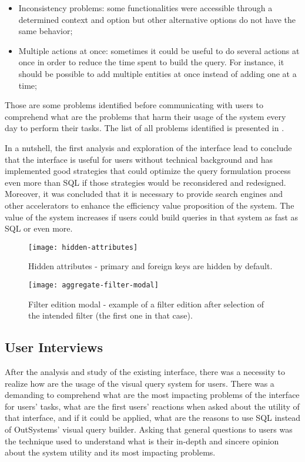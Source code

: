 \begin{itemize}
    \item Inconsistency problems: some functionalities were accessible through a determined context and option but other alternative options do not have the same behavior;
    \item Multiple actions at once: sometimes it could be useful to do several actions at once in order to reduce the time spent to build the query. For instance, it should be possible to add multiple entities at once instead of adding one at a time; 
\end{itemize}

Those are some problems identified before communicating with users to comprehend what are the problems that harm their usage of the system every day to perform their tasks. The list of all problems identified is presented in .

In a nutshell, the first analysis and exploration of the interface lead to conclude that the interface is useful for users without technical background and has implemented good strategies that could optimize the query formulation process even more than \gls{SQL} if those strategies would be reconsidered and redesigned. Moreover, it was concluded that it is necessary to provide search engines and other accelerators to enhance the efficiency value proposition of the system. The value of the system increases if users could build queries in that system as fast as \gls{SQL} or even more.

\begin{figure}[htbp]
	\centering
	\texttt{[image: hidden-attributes]}
	\caption{Hidden attributes - primary and foreign keys are hidden by default.}
	\label{fig:hiddenAttributes}
\end{figure}

\begin{figure}[htbp]
	\centering
	\texttt{[image: aggregate-filter-modal]}
	\caption{Filter edition modal - example of a filter edition after selection of the intended filter (the first one in that case).}
	\label{fig:aggregateFilterModal}
\end{figure}

\subsection{User Interviews}
\label{subsec:user_interviews}

After the analysis and study of the existing interface, there was a necessity to realize how are the usage of the visual query system for users. There was a demanding to comprehend what are the most impacting problems of the interface for users' tasks, what are the first users' reactions when asked about the utility of that interface, and if it could be applied, what are the reasons to use \gls{SQL} instead of OutSystems' visual query builder. Asking that general questions to users was the technique used to understand what is their in-depth and sincere opinion about the system utility and its most impacting problems.

